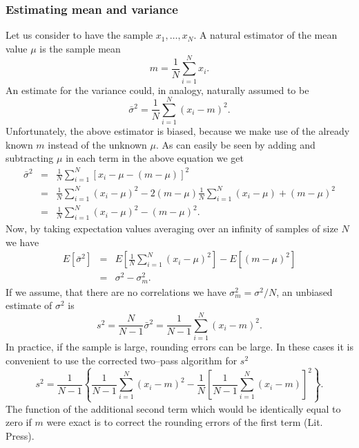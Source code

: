 \subsubsection{Estimating mean and variance}
Let us consider to have the sample $x_1, \ldots, x_N$. A natural
estimator of the mean value $\mu$ is the sample mean
\begin{equation*}
m= \frac{1}{N} \sum_{i=1}^N x_i.
\end{equation*}
An estimate for the variance could, in analogy, naturally assumed to
be
\begin{equation*}
  \bar{\sigma}^2 = \frac{1}{N} \sum_{i=1}^N (x_i -m)^2.
\end{equation*}
Unfortunately, the above estimator is biased, because we make use of
the already known $m$ instead of the unknown $\mu$. As can easily be
seen
by adding and subtracting $\mu$ in each term in the above equation we
get
\begin {eqnarray*}
 \bar{\sigma}^2 &=& \frac{1}{N} \sum_{i=1}^N [x_i - \mu -(m-\mu)]^2 \\
                & = & \frac{1}{N} \sum_{i=1}^N (x_i - \mu)^2
                              -2(m-\mu)\frac{1}{N} \sum_{i=1}^N (x_i
                                   - \mu)
                           +(m-\mu)^2 \\
               & = & \frac{1}{N} \sum_{i=1}^N (x_i - \mu)^2 - (m-\mu)^2.
\end{eqnarray*}
Now, by taking expectation values averaging over an infinity of samples
of size $N$ we have
\begin{eqnarray*}
E[\bar{\sigma}^2] &= & E\left[\frac{1}{N} \sum_{i=1}^N (x_i - \mu)^2
                                \right]
            - E\left[(m-\mu)^2 \right] \\
       & = & \sigma^2 - \sigma_m^2.
\end{eqnarray*}
If we assume, that there are no correlations we have $\sigma^2_m=
\sigma^2/N$, an unbiased estimate of $\sigma^2$ is
\begin{equation*}
s^2 = \frac{N}{N-1} \bar{\sigma}^2 = \frac{1}{N-1} \sum_{i=1}^N 
      (x_i - m)^2.
\end{equation*}
In practice, if the sample is large, rounding errors can be large. In
these cases it is convenient to use the 
corrected two--pass algorithm for $s^2$
\begin{equation*}
s^2 = \frac{1}{N-1} \left\{ \frac{1}{N-1} \sum_{i=1}^N 
      (x_i - m)^2 - \frac{1}{N} \left[ \frac{1}{N-1} \sum_{i=1}^N 
      (x_i - m) \right]^2  \right\}.
\end{equation*}
The function of the additional second term which would be identically
equal to zero if $m$ were exact is to correct the rounding errors of
the first term (Lit. Press).

